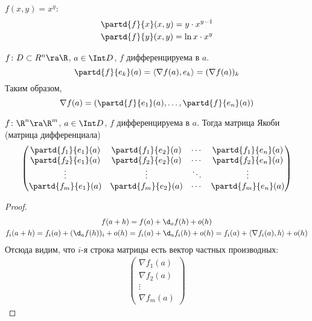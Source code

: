 \begin{exmp}
	$f(x, y) = x^y$:
	\begin{gather*}
		\partd{f}{x} (x, y) = y \cdot x^{y - 1} \\
		\partd{f}{y} (x, y) = \ln x \cdot x^y \\
	\end{gather*}
\end{exmp}

\begin{conseq}
	$f\colon D \subset R^n \ra \R$, $a \in \Int D$, $f$ дифференцируема в $a$.
	\[ \partd{f}{e_k} (a) = \left<\nabla f(a), e_k\right> = (\nabla f(a))_k \]
	Таким образом,
	\[ \nabla f(a) = \left( \partd{f}{e_1} (a), \dots, \partd{f}{e_n} (a) \right) \]
\end{conseq}

\begin{conseq}
	$f\colon \R^n \ra \R^m$, $a \in \Int D$, $f$ дифференцируема в $a$.
	Тогда матрица Якоби (матрица дифференциала)
	\[\begin{pmatrix}
		\partd{f_1}{e_1}(a) & \partd{f_1}{e_2}(a)
			&\cdots& \partd{f_1}{e_n}(a) \\
		\partd{f_2}{e_1}(a) & \partd{f_2}{e_2}(a)
			&\cdots& \partd{f_2}{e_n}(a) \\
		\vdots & \vdots & \ddots & \vdots \\
		\partd{f_m}{e_1}(a) & \partd{f_m}{e_2}(a)
			&\cdots& \partd{f_m}{e_n}(a)
	\end{pmatrix}\]
\end{conseq}
\begin{proof}
	\begin{gather*}
		f(a + h) = f(a) + \d_a f(h) + o(h) \\
		f_i(a + h) = f_i(a) + (\d_a f(h))_i + o(h) = f_i(a) + \d_a f_i(h) + o(h) = f_i(a) + \left<\nabla f_i(a), h\right> + o(h)
	\end{gather*}
	Отсюда видим, что $i$-я строка матрицы есть вектор частных производных:
	\begin{gather*}
		\begin{pmatrix}
			\nabla f_1(a) \\
			\nabla f_2(a) \\
			\vdots \\
			\nabla f_m(a)
		\end{pmatrix}
	\end{gather*}
\end{proof}

